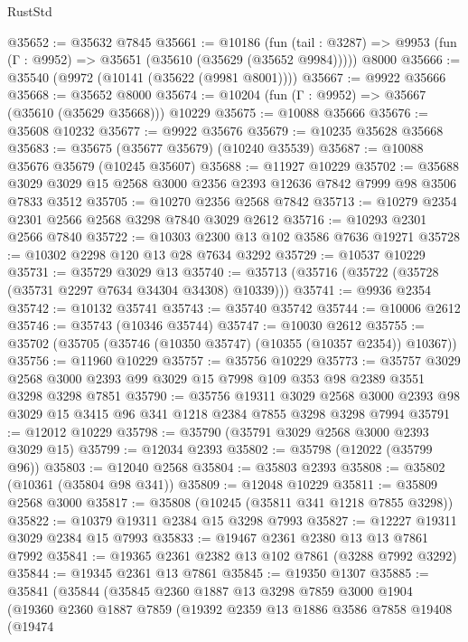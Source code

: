 \begin{lexlean}{RustStd}
\begin{coremodule}
@35652 := @35632 @7845
@35661 := @10186
    (fun (tail : @3287) => @9953 (fun (Γ : @9952) => @35651 (@35610 (@35629 (@35652 @9984)))))
    @8000
@35666 := @35540 (@9972 (@10141 (@35622 (@9981 @8001))))
@35667 := @9922 @35666
@35668 := @35652 @8000
@35674 := @10204 (fun (Γ : @9952) => @35667 (@35610 (@35629 @35668))) @10229
@35675 := @10088 @35666
@35676 := @35608 @10232
@35677 := @9922 @35676
@35679 := @10235 @35628 @35668
@35683 := @35675 (@35677 @35679) (@10240 @35539)
@35687 := @10088 @35676 @35679 (@10245 @35607)
@35688 := @11927 @10229
@35702 := @35688 @3029 @3029 @15 @2568 @3000 @2356 @2393 @12636 @7842 @7999 @98 @3506 @7833 @3512
@35705 := @10270 @2356 @2568 @7842
@35713 := @10279 @2354 @2301 @2566 @2568 @3298 @7840 @3029 @2612
@35716 := @10293 @2301 @2566 @7840
@35722 := @10303 @2300 @13 @102 @3586 @7636 @19271
@35728 := @10302 @2298 @120 @13 @28 @7634 @3292
@35729 := @10537 @10229
@35731 := @35729 @3029 @13
@35740 := @35713 (@35716 (@35722 (@35728 (@35731 @2297 @7634 @34304 @34308) @10339)))
@35741 := @9936 @2354
@35742 := @10132 @35741
@35743 := @35740 @35742
@35744 := @10006 @2612
@35746 := @35743 (@10346 @35744)
@35747 := @10030 @2612
@35755 := @35702 (@35705 (@35746 (@10350 @35747) (@10355 (@10357 @2354)) @10367))
@35756 := @11960 @10229
@35757 := @35756 @10229
@35773 := @35757
    @3029
    @2568
    @3000
    @2393
    @99
    @3029
    @15
    @7998
    @109
    @353
    @98
    @2389
    @3551
    @3298
    @3298
    @7851
@35790 := @35756
    @19311
    @3029
    @2568
    @3000
    @2393
    @98
    @3029
    @15
    @3415
    @96
    @341
    @1218
    @2384
    @7855
    @3298
    @3298
    @7994
@35791 := @12012 @10229
@35798 := @35790 (@35791 @3029 @2568 @3000 @2393 @3029 @15)
@35799 := @12034 @2393
@35802 := @35798 (@12022 (@35799 @96))
@35803 := @12040 @2568
@35804 := @35803 @2393
@35808 := @35802 (@10361 (@35804 @98 @341))
@35809 := @12048 @10229
@35811 := @35809 @2568 @3000
@35817 := @35808 (@10245 (@35811 @341 @1218 @7855 @3298))
@35822 := @10379 @19311 @2384 @15 @3298 @7993
@35827 := @12227 @19311 @3029 @2384 @15 @7993
@35833 := @19467 @2361 @2380 @13 @13 @7861 @7992
@35841 := @19365 @2361 @2382 @13 @102 @7861 (@3288 @7992 @3292)
@35844 := @19345 @2361 @13 @7861
@35845 := @19350 @1307
@35885 := @35841
    (@35844
      (@35845
        @2360
        @1887
        @13
        @3298
        @7859
        @3000
        @1904
        (@19360
          @2360
          @1887
          @7859
          (@19392
            @2359
            @13
            @1886
            @3586
            @7858
            @19408
            (@19474

\end{coremodule}
\end{lexlean}
